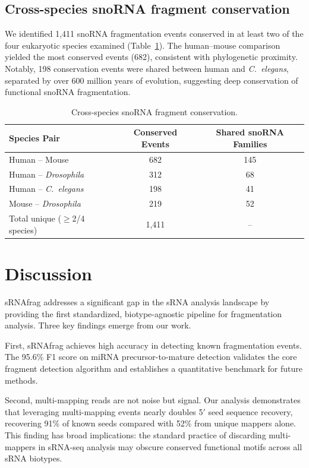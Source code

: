 \documentclass[11pt]{article}
\begin{document}
\subsection{Cross-species snoRNA fragment conservation}

We identified 1,411 snoRNA fragmentation events conserved in at least two of the four eukaryotic species examined (Table~\ref{tab:conservation}). The human--mouse comparison yielded the most conserved events (682), consistent with phylogenetic proximity. Notably, 198 conservation events were shared between human and \textit{C.~elegans}, separated by over 600 million years of evolution, suggesting deep conservation of functional snoRNA fragmentation.

\begin{table}[ht]
\centering
\caption{Cross-species snoRNA fragment conservation.}
\label{tab:conservation}
\begin{tabular}{lcc}
\toprule
\textbf{Species Pair} & \textbf{Conserved Events} & \textbf{Shared snoRNA Families} \\
\midrule
Human -- Mouse & 682 & 145 \\
Human -- \textit{Drosophila} & 312 & 68 \\
Human -- \textit{C.~elegans} & 198 & 41 \\
Mouse -- \textit{Drosophila} & 219 & 52 \\
\midrule
Total unique ($\geq$2/4 species) & 1,411 & -- \\
\bottomrule
\end{tabular}
\end{table}

\section{Discussion}

sRNAfrag addresses a significant gap in the sRNA analysis landscape by providing the first standardized, biotype-agnostic pipeline for fragmentation analysis. Three key findings emerge from our work.

First, sRNAfrag achieves high accuracy in detecting known fragmentation events. The 95.6\% F1 score on miRNA precursor-to-mature detection validates the core fragment detection algorithm and establishes a quantitative benchmark for future methods.

Second, multi-mapping reads are not noise but signal. Our analysis demonstrates that leveraging multi-mapping events nearly doubles 5$'$ seed sequence recovery, recovering 91\% of known seeds compared with 52\% from unique mappers alone. This finding has broad implications: the standard practice of discarding multi-mappers in sRNA-seq analysis may obscure conserved functional motifs across all sRNA biotypes.
\end{document}
